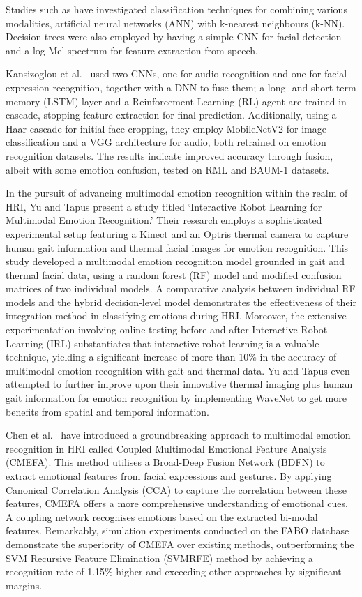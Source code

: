 Studies such as \cite{Song2018-vu} have investigated classification techniques for combining various modalities, artificial neural networks (ANN) with k-nearest neighbours (k-NN). Decision trees were also employed by \cite{Adiga2020-wv} having a simple CNN for facial detection and a log-Mel spectrum for feature extraction from speech.

Kansizoglou et al.\ \cite{Kansizoglou2022-ih} used two CNNs, one for audio recognition and one for facial expression recognition, together with a DNN to fuse them; a long- and short-term memory (LSTM) layer and a Reinforcement Learning (RL) agent are trained in cascade, stopping feature extraction for final prediction. Additionally, using a Haar cascade for initial face cropping, they employ MobileNetV2 for image classification and a VGG architecture for audio, both retrained on emotion recognition datasets. The results indicate improved accuracy through fusion, albeit with some emotion confusion, tested on RML and BAUM-1 datasets.

In the pursuit of advancing multimodal emotion recognition within the realm of HRI, Yu and Tapus \cite{Yu2019-ku} present a study titled `Interactive Robot Learning for Multimodal Emotion Recognition.' Their research employs a sophisticated experimental setup featuring a Kinect and an Optris thermal camera to capture human gait information and thermal facial images for emotion recognition. This study developed a multimodal emotion recognition model grounded in gait and thermal facial data, using a random forest (RF) model and modified confusion matrices of two individual models. A comparative analysis between individual RF models and the hybrid decision-level model demonstrates the effectiveness of their integration method in classifying emotions during HRI. Moreover, the extensive experimentation involving online testing before and after Interactive Robot Learning (IRL) substantiates that interactive robot learning is a valuable technique, yielding a significant increase of more than 10\% in the accuracy of multimodal emotion recognition with gait and thermal data. Yu and Tapus \cite{Yu2020-zq} even attempted to further improve upon their innovative thermal imaging plus human gait information for emotion recognition by implementing WaveNet to get more benefits from spatial and temporal information.

Chen et al.\ \cite{Chen2023-ss} have introduced a groundbreaking approach to multimodal emotion recognition in HRI called Coupled Multimodal Emotional Feature Analysis (CMEFA). This method utilises a Broad-Deep Fusion Network (BDFN) to extract emotional features from facial expressions and gestures. By applying Canonical Correlation Analysis (CCA) to capture the correlation between these features, CMEFA offers a more comprehensive understanding of emotional cues. A coupling network recognises emotions based on the extracted bi-modal features. Remarkably, simulation experiments conducted on the FABO database demonstrate the superiority of CMEFA over existing methods, outperforming the SVM Recursive Feature Elimination (SVMRFE) method by achieving a recognition rate of 1.15\% higher and exceeding other approaches by significant margins.

